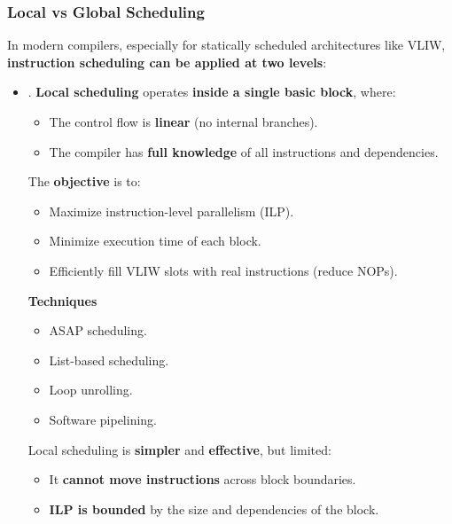 \subsubsection{Local vs Global Scheduling}

In modern compilers, especially for statically scheduled architectures like VLIW, \textbf{instruction scheduling can be applied at two levels}:
\begin{itemize}
    \item {}. \textbf{Local scheduling} operates \textbf{inside a single basic block}, where:
    \begin{itemize}
        \item The control flow is \textbf{linear} (no internal branches).
        \item The compiler has \textbf{full knowledge} of all instructions and dependencies.
    \end{itemize}
    \textcolor{Green3}{} The \textcolor{Green3}{\textbf{objective}} is to:
    \begin{itemize}
        \item Maximize instruction-level parallelism (ILP).
        \item Minimize execution time of each block.
        \item Efficiently fill VLIW slots with real instructions (reduce NOPs).
    \end{itemize}
    \textcolor{Green3}{ \textbf{Techniques}}
    \begin{itemize}
        \item ASAP scheduling.
        \item List-based scheduling.
        \item Loop unrolling.
        \item Software pipelining.
    \end{itemize}
    Local scheduling is \textbf{simpler} and \textbf{effective}, but limited:
    \begin{itemize}[label=\textcolor{Red2}{}]
        \item It \textbf{cannot move instructions} across block boundaries.
        \item \textbf{ILP is bounded} by the size and dependencies of the block.
    \end{itemize}



\end{itemize}
